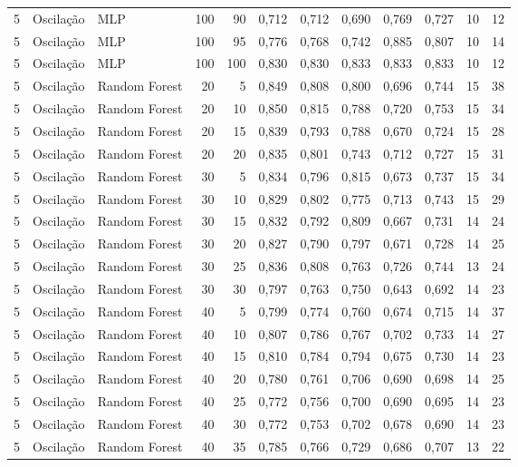 \begin{longtable}{@{}rllrrrrrrrrr@{}}
5 & Oscilação & MLP & 100 & 90 & 0,712 & 0,712 & 0,690 & 0,769 & 0,727 & 10 & 12 \\
5 & Oscilação & MLP & 100 & 95 & 0,776 & 0,768 & 0,742 & 0,885 & 0,807 & 10 & 14 \\
5 & Oscilação & MLP & 100 & 100 & 0,830 & 0,830 & 0,833 & 0,833 & 0,833 & 10 & 12 \\
5 & Oscilação & Random Forest & 20 & 5 & 0,849 & 0,808 & 0,800 & 0,696 & 0,744 & 15 & 38 \\
5 & Oscilação & Random Forest & 20 & 10 & 0,850 & 0,815 & 0,788 & 0,720 & 0,753 & 15 & 34 \\
5 & Oscilação & Random Forest & 20 & 15 & 0,839 & 0,793 & 0,788 & 0,670 & 0,724 & 15 & 28 \\
5 & Oscilação & Random Forest & 20 & 20 & 0,835 & 0,801 & 0,743 & 0,712 & 0,727 & 15 & 31 \\
5 & Oscilação & Random Forest & 30 & 5 & 0,834 & 0,796 & 0,815 & 0,673 & 0,737 & 15 & 34 \\
5 & Oscilação & Random Forest & 30 & 10 & 0,829 & 0,802 & 0,775 & 0,713 & 0,743 & 15 & 29 \\
5 & Oscilação & Random Forest & 30 & 15 & 0,832 & 0,792 & 0,809 & 0,667 & 0,731 & 14 & 24 \\
5 & Oscilação & Random Forest & 30 & 20 & 0,827 & 0,790 & 0,797 & 0,671 & 0,728 & 14 & 25 \\
5 & Oscilação & Random Forest & 30 & 25 & 0,836 & 0,808 & 0,763 & 0,726 & 0,744 & 13 & 24 \\
5 & Oscilação & Random Forest & 30 & 30 & 0,797 & 0,763 & 0,750 & 0,643 & 0,692 & 14 & 23 \\
5 & Oscilação & Random Forest & 40 & 5 & 0,799 & 0,774 & 0,760 & 0,674 & 0,715 & 14 & 37 \\
5 & Oscilação & Random Forest & 40 & 10 & 0,807 & 0,786 & 0,767 & 0,702 & 0,733 & 14 & 27 \\
5 & Oscilação & Random Forest & 40 & 15 & 0,810 & 0,784 & 0,794 & 0,675 & 0,730 & 14 & 23 \\
5 & Oscilação & Random Forest & 40 & 20 & 0,780 & 0,761 & 0,706 & 0,690 & 0,698 & 14 & 25 \\
5 & Oscilação & Random Forest & 40 & 25 & 0,772 & 0,756 & 0,700 & 0,690 & 0,695 & 14 & 23 \\
5 & Oscilação & Random Forest & 40 & 30 & 0,772 & 0,753 & 0,702 & 0,678 & 0,690 & 14 & 23 \\
5 & Oscilação & Random Forest & 40 & 35 & 0,785 & 0,766 & 0,729 & 0,686 & 0,707 & 13 & 22 \\

\end{longtable}
